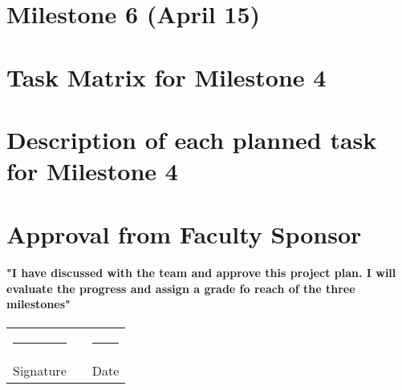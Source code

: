 \documentclass[12pt]{article}
\newcommand\tab[1][1cm]{\hspace*{#1}}
\newcommand{\doubleSignature}[2]{
	\begin{center}
		
	\end{center}
	\vspace{2cm}
	
	\noindent
	\begin{tabular}{lcl}
		\rule{7cm}{1pt} & \hspace{2cm} & \rule{3cm}{1pt} \\
		#1 & & #2
	\end{tabular}
	\vspace{1cm}
}
\begin{document}
\section{Milestone 6 (April 15)}

\section{Task Matrix for Milestone 4}

\section{Description of each planned task for Milestone 4}

\section{Approval from Faculty Sponsor}
\paragraph{\tab "I have discussed with the team and approve this project plan. I will evaluate the progress and assign a grade fo reach of the three milestones"}
\doubleSignature{Signature}{Date}
\end{document}
